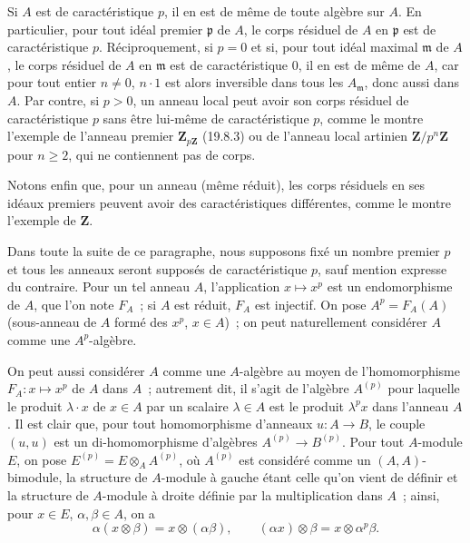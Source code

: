 \begin{env}[21.1.3]
\label{0.21.1.3-fr}
Si $A$ est de caractéristique $p$, il en est de même de toute algèbre sur
$A$. En particulier, pour tout idéal premier $\mathfrak p$ de $A$, le corps
résiduel de $A$ en $\mathfrak p$ est de caractéristique $p$. Réciproquement,
si $p=0$ et si, pour tout idéal maximal $\mathfrak m$ de $A$, le corps
résiduel de $A$ en $\mathfrak m$ est de caractéristique $0$, il en est de même
de $A$, car pour tout entier $n\neq0$, $n\cdot1$ est alors inversible dans
tous les $A_{\mathfrak m}$, donc aussi dans $A$. Par contre, si $p>0$, un
anneau local peut avoir son corps résiduel de caractéristique $p$ sans être
lui-même de caractéristique $p$, comme le montre l'exemple de l'anneau
premier $\mathbf Z_{p\mathbf Z}$ (19.8.3) ou de l'anneau local artinien
$\mathbf Z/p^n\mathbf Z$ pour $n\geq2$, qui ne contiennent pas de corps.

Notons enfin que, pour un anneau (même réduit), les corps résiduels en ses
idéaux premiers peuvent avoir des caractéristiques différentes, comme le
montre l'exemple de $\mathbf Z$.
\end{env}

\begin{env}[21.1.4]
\label{0.21.1.4-fr}
Dans toute la suite de ce paragraphe, nous supposons fixé un nombre premier
$p$ et tous les anneaux seront supposés de caractéristique $p$, sauf mention
expresse du contraire. Pour un tel anneau $A$, l'application $x\mapsto x^p$
est un endomorphisme de $A$, que l'on note $F_A$~; si $A$ est réduit, $F_A$
est injectif. On pose $A^p=F_A(A)$ (sous-anneau de $A$ formé des $x^p$,
$x\in A$)~; on peut naturellement considérer $A$ comme une $A^p$-algèbre.

On peut aussi considérer $A$ comme une $A$-algèbre au moyen de
l'homomorphisme $F_A:x\mapsto x^p$ de $A$ dans $A$~; autrement dit, il
s'agit de l'algèbre $A^{(p)}$ pour laquelle le produit $\lambda\cdot x$ de
$x\in A$ par un scalaire $\lambda\in A$ est le produit $\lambda^p x$ dans
l'anneau $A$. Il est clair que, pour tout homomorphisme d'anneaux $u:A\to B$,
le couple $(u,u)$ est un di-homomorphisme d'algèbres $A^{(p)}\to B^{(p)}$.
Pour tout $A$-module $E$, on pose $E^{(p)}=E\otimes_A A^{(p)}$, où
$A^{(p)}$ est considéré comme un $(A,A)$-bimodule, la structure de
$A$-module à gauche étant celle qu'on vient de définir et la structure de
$A$-module à droite définie par la multiplication dans $A$~; ainsi, pour
$x\in E$, $\alpha,\beta\in A$, on a
\[
  \alpha(x\otimes\beta)=x\otimes(\alpha\beta),\qquad
  (\alpha x)\otimes\beta=x\otimes\alpha^p\beta.
\]
\end{env}

